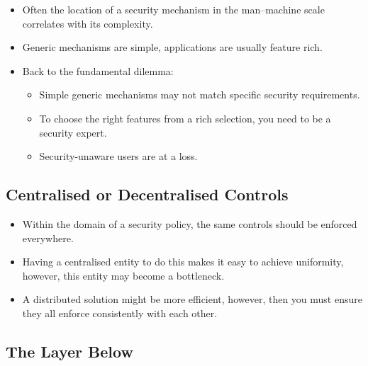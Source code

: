 \documentclass{beamer}
\begin{document}
\begin{frame}{\insertsubsectionhead}
  \begin{itemize}
    \item Often the location of a security mechanism in the man--machine scale 
      correlates with its complexity.

    \item Generic mechanisms are simple, applications are usually feature rich.

    \item Back to the fundamental dilemma:
      \begin{itemize}
        \item Simple generic mechanisms may not match specific security 
          requirements.

        \item To choose the right features from a rich selection, you need to 
          be a security expert.

        \item Security-unaware users are at a loss.
      \end{itemize}
  \end{itemize}
\end{frame}

\subsection{Centralised or Decentralised Controls}

\begin{frame}{\insertsubsectionhead}
  \begin{itemize}
    \item Within the domain of a security policy, the same controls should be 
      enforced everywhere.

    \item Having a centralised entity to do this makes it easy to achieve 
      uniformity, however, this entity may become a bottleneck.

    \item A distributed solution might be more efficient, however, then you 
      must ensure they all enforce consistently with each other.
  \end{itemize}
\end{frame}

\subsection{The Layer Below}
\end{document}
